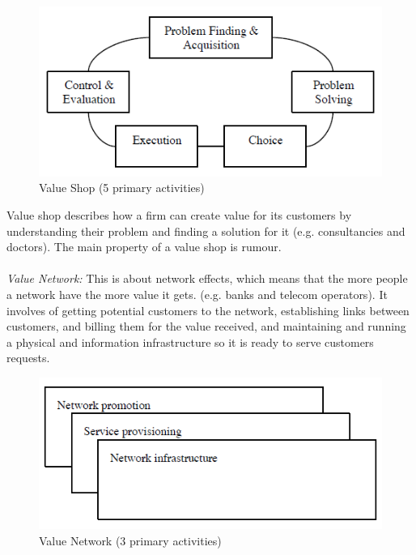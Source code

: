 \begin{figure}
\begin{center}
\includegraphics[scale=0.8]{valueshopnew}
\caption[Value Shop]{Value Shop (5 primary activities) \cite{osterwalderthesis}}
\label{fig:ValueShop}
\end{center}
\end{figure}
Value shop describes how a firm can create value for its customers by understanding their problem and finding a solution for it (e.g. consultancies and doctors). The main property of a value shop is rumour.  \\ \\
\emph{Value Network:}
This is about network effects, which means that the more people a network have the more value it gets. (e.g. banks and telecom operators). It involves of getting potential customers to the network, establishing links between customers, and billing them for the value received, and maintaining and running a physical and information infrastructure so it is ready to serve customers requests. 
\begin{figure}
\begin{center}
\includegraphics[scale=0.7]{valuenetworknew}
\caption[Value Network]{Value Network (3 primary activities) \cite{osterwalderthesis}}
\label{fig:ValueNetwork}
\end{center}
\end{figure}

